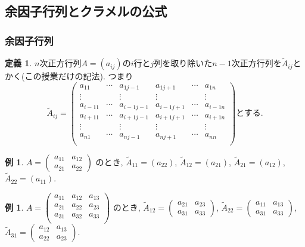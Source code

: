 \documentclass[dvipdfmx,a4paper,11pt]{article}
\theoremstyle{definition}
\newtheorem{dfn}[thm]{定義}
\newtheorem{exa}[thm]{例}
\begin{document}
 


\subsection{余因子行列とクラメルの公式\cite[3.4節]{M}}
\subsubsection{余因子行列}
\begin{tcolorbox}[
    colback = white,
    colframe = green!35!black,
    fonttitle = \bfseries,
    breakable = true]
    \begin{dfn}
    $n$次正方行列$A=(a_{ij})$の$i$行と$j$列を取り除いた$n-1$次正方行列を$\tilde{A}_{ij}$とかく(この授業だけの記法). つまり
  $$
  \tilde{A}_{ij}
  =
    \begin{pmatrix}
a_{11}&   \cdots &a_{1j-1}&a_{1j+1}&\cdots&a_{1n} \\
\vdots&   		& \vdots &\vdots &   		&\vdots  \\
a_{i-11}&   \cdots &a_{i-1j-1}&a_{i-1j+1}&\cdots&a_{i-1n} \\
a_{i+11}&   \cdots &a_{i+1j-1}&a_{i+1j+1}&\cdots&a_{i+1n} \\
\vdots&   		& \vdots &\vdots &   		&\vdots  \\
a_{n1}&   \cdots &a_{nj-1}&a_{nj+1}&\cdots&a_{nn} \\
\end{pmatrix}
\text{とする.}
$$
    \end{dfn}
 \end{tcolorbox}
\begin{exa}
$A=
\begin{pmatrix}
a_{11} & a_{12} \\
a_{21} & a_{22}
\end{pmatrix}
$
のとき, 
$  \tilde{A}_{11} =(a_{22})$, $  \tilde{A}_{12} =(a_{21})$, $  \tilde{A}_{21} =(a_{12})$, $  \tilde{A}_{22} =(a_{11})$.
\end{exa}
\begin{exa}
$
A=
\begin{pmatrix}
a_{11} & a_{12}&a_{13} \\
a_{21} & a_{22}&a_{23} \\
a_{31} & a_{32}&a_{33} \\
\end{pmatrix}
$
のとき, 
$  \tilde{A}_{12} =
\begin{pmatrix}
a_{21} & a_{23} \\
a_{31} & a_{33}
\end{pmatrix}
$, 
$  \tilde{A}_{22} =
\begin{pmatrix}
a_{11} & a_{13} \\
a_{31} & a_{33}
\end{pmatrix}
$, 
$  \tilde{A}_{31} =
\begin{pmatrix}
a_{12} & a_{13} \\
a_{22} & a_{23}
\end{pmatrix}
$.
\end{exa}
\end{document}
